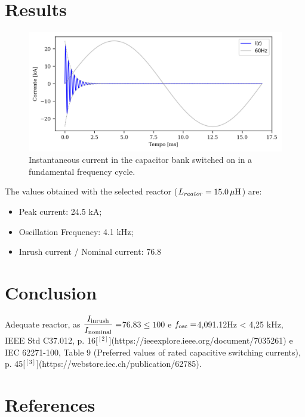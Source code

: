 \documentclass[a4paper]{article}
\begin{document}
	\section{Results}
	\begin{figure}[!hbp]
		\centering
		\includegraphics{Correntes.png}
		\caption{Instantaneous current in the capacitor bank switched on in a fundamental frequency cycle.}
		\label{fig:picture2}
	\end{figure}
	
	The values obtained with the selected reactor ($L_{reator} = {{15.0}} \, \mu \rm{H} $) are:
	\begin{itemize}[label=\textendash]
		\item Peak current: {{24.5 kA}};
		\item Oscillation Frequency: {{4.1 k}}Hz;
		\item Inrush current / Nominal current: {{76.8}}
	\end{itemize}
	
	\section{Conclusion}
	{{Adequate reactor, as $\dfrac{I_{\rm inrush}}{I_{\rm nominal}} = $76.83$\le 100$ e $f_{\rm osc} = $4,091.12Hz < 4,25 kHz, IEEE Std C37.012, p. 16[$^{[2]}$](https://ieeexplore.ieee.org/document/7035261) e IEC 62271-100, Table 9 (Preferred values of rated capacitive switching currents), p. 45[$^{[3]}$](https://webstore.iec.ch/publication/62785).}}
	
	\section{References}
	
\end{document}
